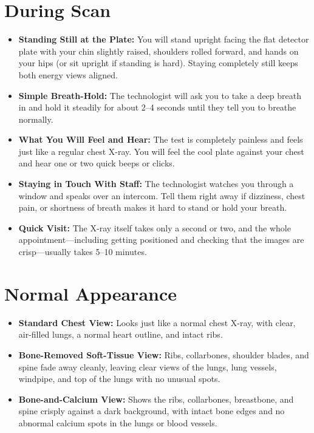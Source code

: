 \section{During Scan}
\begin{itemize}
    \item \textbf{Standing Still at the Plate:} You will stand upright facing the flat detector plate with your chin slightly raised, shoulders rolled forward, and hands on your hips (or sit upright if standing is hard). Staying completely still keeps both energy views aligned.
    \item \textbf{Simple Breath-Hold:} The technologist will ask you to take a deep breath in and hold it steadily for about 2--4 seconds until they tell you to breathe normally.
    \item \textbf{What You Will Feel and Hear:} The test is completely painless and feels just like a regular chest X-ray. You will feel the cool plate against your chest and hear one or two quick beeps or clicks.
    \item \textbf{Staying in Touch With Staff:} The technologist watches you through a window and speaks over an intercom. Tell them right away if dizziness, chest pain, or shortness of breath makes it hard to stand or hold your breath.
    \item \textbf{Quick Visit:} The X-ray itself takes only a second or two, and the whole appointment---including getting positioned and checking that the images are crisp---usually takes 5--10 minutes.
\end{itemize}

\section{Normal Appearance}
\begin{itemize}
    \item \textbf{Standard Chest View:} Looks just like a normal chest X-ray, with clear, air-filled lungs, a normal heart outline, and intact ribs.
    \item \textbf{Bone-Removed Soft-Tissue View:} Ribs, collarbones, shoulder blades, and spine fade away cleanly, leaving clear views of the lungs, lung vessels, windpipe, and top of the lungs with no unusual spots.
    \item \textbf{Bone-and-Calcium View:} Shows the ribs, collarbones, breastbone, and spine crisply against a dark background, with intact bone edges and no abnormal calcium spots in the lungs or blood vessels.
\end{itemize}

